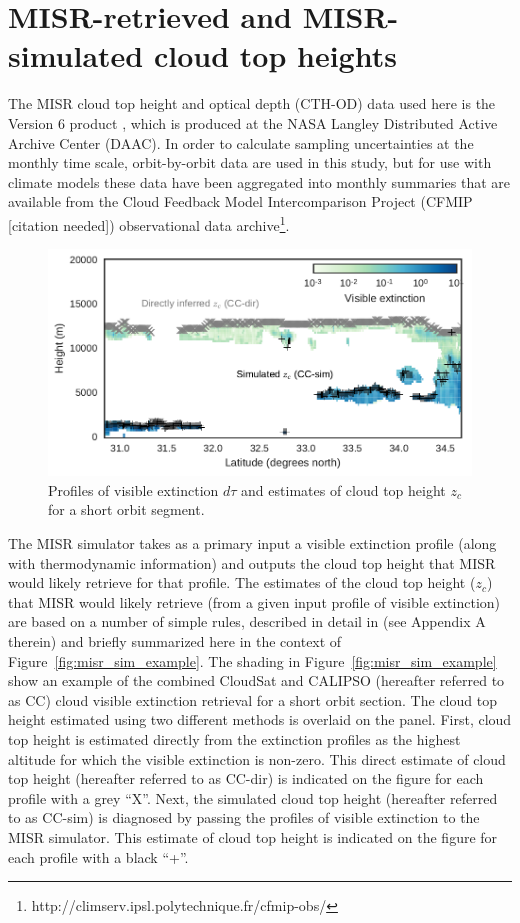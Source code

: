 \section{MISR-retrieved and MISR-simulated cloud top
heights}\label{sec:misrRetrievals}

The MISR cloud top height and optical depth (CTH-OD) data used here is
the Version 6 product \citep{marchand_et_al_2010}, which is produced at
the NASA Langley Distributed Active Archive Center (DAAC). In order to
calculate sampling uncertainties at the monthly time scale,
orbit-by-orbit data are used in this study, but for use with climate
models these data have been aggregated into monthly summaries that are
available from the Cloud Feedback Model Intercomparison Project (CFMIP
{[}citation needed{]}) observational data archive\footnote{http://climserv.ipsl.polytechnique.fr/cfmip-obs/}.

\begin{figure}[htbp]
\centering
\includegraphics{graphics/misr_sim_example.pdf}
\caption{\label{fig:misr_sim_example}Profiles of visible extinction
\(d\tau\) and estimates of cloud top height \(z_c\) for a short orbit
segment.}\label{fig:misrux5fsimux5fexample}
\end{figure}

The MISR simulator takes as a primary input a visible extinction profile
(along with thermodynamic information) and outputs the cloud top height
that MISR would likely retrieve for that profile. The estimates of the
cloud top height (\(z_c\)) that MISR would likely retrieve (from a given
input profile of visible extinction) are based on a number of simple
rules, described in detail in \citet{marchand_and_ackerman_2010} (see
Appendix A therein) and briefly summarized here in the context of
Figure~\ref{fig:misr_sim_example}. The shading in
Figure~\ref{fig:misr_sim_example} show an example of the combined
CloudSat and CALIPSO (hereafter referred to as CC) cloud visible
extinction retrieval for a short orbit section. The cloud top height
estimated using two different methods is overlaid on the panel. First,
cloud top height is estimated directly from the extinction profiles as
the highest altitude for which the visible extinction is non-zero. This
direct estimate of cloud top height (hereafter referred to as CC-dir) is
indicated on the figure for each profile with a grey ``X''. Next, the
simulated cloud top height (hereafter referred to as CC-sim) is
diagnosed by passing the profiles of visible extinction to the MISR
simulator. This estimate of cloud top height is indicated on the figure
for each profile with a black ``+''.

